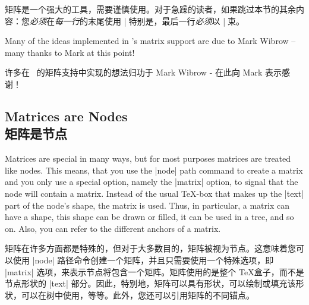矩阵是一个强大的工具，需要谨慎使用。对于急躁的读者，如果跳过本节的其余内容：您\emph{必须}在\emph{每一行}的末尾使用 |\|。特别是，最后一行\emph{必须}以 |\| 结束。

Many of the ideas implemented in \tikzname's matrix support are due to Mark
Wibrow -- many thanks to Mark at this point!

许多在 \tikzname\ 的矩阵支持中实现的想法归功于 Mark Wibrow - 在此向 Mark 表示感谢！
\subsection{Matrices are Nodes\\矩阵是节点}

Matrices are special in many ways, but for most purposes matrices are treated
like nodes. This means, that you use the |node| path command to create a matrix
and you only use a special option, namely the |matrix| option, to signal that
the node will contain a matrix. Instead of the usual \TeX-box that makes up the
|text| part of the node's shape, the matrix is used. Thus, in particular, a
matrix can have a shape, this shape can be drawn or filled, it can be used in a
tree, and so on. Also, you can refer to the different anchors of a matrix.

矩阵在许多方面都是特殊的，但对于大多数目的，矩阵被视为节点。这意味着您可以使用 |node| 路径命令创建一个矩阵，并且只需要使用一个特殊选项，即 |matrix| 选项，来表示节点将包含一个矩阵。矩阵使用的是整个 \TeX 盒子，而不是节点形状的 |text| 部分。因此，特别地，矩阵可以具有形状，可以绘制或填充该形状，可以在树中使用，等等。此外，您还可以引用矩阵的不同锚点。

